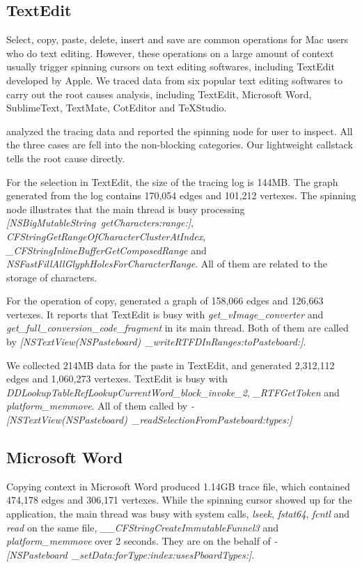 \subsection{TextEdit}
Select, copy, paste, delete, insert and save are common operations for Mac users who do text
editing. However, these operations on a large amount of context usually trigger
spinning cursors on text editing softwares, including TextEdit developed by Apple.
We traced data from six popular text editing softwares to carry out the root causes analysis,
including TextEdit, Microsoft Word, SublimeText, TextMate, CotEditor and TeXStudio.

\xxx analyzed the tracing data and reported the spinning node for user to inspect.
All the three cases are fell into the non-blocking categories.
Our lightweight callstack tells the root cause directly.

For the selection in TextEdit, the size of the tracing log is 144MB.
The graph generated from the log contains 170,054 edges and 101,212 vertexes.
The spinning node illustrates that the main thread is busy processing
\textit{[NSBigMutableString\ getCharacters:range:]},
\textit{CFStringGetRangeOfCharacterClusterAtIndex},
\textit{\_CFStringInlineBufferGetComposedRange} and
\textit{NSFastFillAllGlyphHolesForCharacterRange}.
All of them are related to the storage of characters.

For the operation of copy, \xxx generated a graph of 158,066 edges and 126,663 vertexes.
It reports that TextEdit is busy with
\textit{get\_vImage\_converter} and \textit{get\_full\_conversion\_code\_fragment} in its main thread.
Both of them are called by \textit{[NSTextView(NSPasteboard)\ \_writeRTFDInRanges:toPasteboard:]}.

We collected 214MB data for the paste in TextEdit, and generated 2,312,112 edges and 1,060,273
vertexes. TextEdit is busy with \textit{DDLookupTableRefLookupCurrentWord\_block\_invoke\_2},
\textit{\_RTFGetToken} and \textit{platform\_memmove}. All of them called by
\textit{-[NSTextView(NSPasteboard)\ \_readSelectionFromPasteboard:types:]}

\subsection{Microsoft Word}
Copying context in Microsoft Word produced 1.14GB trace file, which contained 474,178 edges and 306,171 vertexes.
While the spinning cursor showed up for the application, the main thread was busy with system calls,
\textit{lseek}, \textit{fstat64}, \textit{fcntl} and \textit{read} on the same file,
\textit{\_\_CFStringCreateImmutableFunnel3} and \textit{platform\_memmove} over 2 seconds.
They are on the behalf of \textit{-[NSPasteboard\ \_setData:forType:index:usesPboardTypes:]}.

